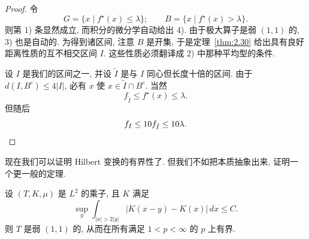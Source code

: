 \begin{proof}
令
\[
G=\{x \mid f^{\star}(x)\leq\lambda\};\qquad B=\{x \mid f^{\star}(x)>\lambda\}.
\]
则第 1) 条显然成立, 而积分的微分学自动给出 4). 由于极大算子是弱 $(1,1)$ 的, 3) 也是自动的. 为得到诸区间, 注意 $B$ 是开集, 于是定理~\ref{thm:2.30} 给出具有良好距离性质的互不相交区间 $I$. 这些性质必须翻译成 2) 中那种平均型的条件.

设 $I$ 是我们的区间之一, 并设 $\tilde{I}$ 是与 $I$ 同心但长度十倍的区间. 由于 $d(I,B^c)\leq 4|I|$, 必有 $x$ 使 $x\in\tilde{I}\cap B^c$. 当然
\[
f_{\tilde{I}}\leq f^{\star}(x)\leq\lambda.
\]
但随后
\[
f_{I}\leq 10f_{\tilde{I}}\leq 10\lambda. \qedhere
\]
\end{proof}

现在我们可以证明 Hilbert 变换的有界性了. 但我们不如把本质抽象出来, 证明一个更一般的定理.

\begin{theorem}\label{thm:2.32}
设 $(T,K,\mu)$ 是 $L^{2}$ 的乘子, 且 $K$ 满足
\[
\sup_{y}\int_{|x|>2|y|}|K(x-y)-K(x)|\,dx\leq C.
\]
则 $T$ 是弱 $(1,1)$ 的, 从而在所有满足 $1<p<\infty$ 的 $p$ 上有界.
\end{theorem}

